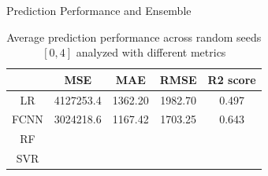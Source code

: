 \documentclass{beamer} %
\begin{document}
\begin{frame}{Prediction Performance and Ensemble}
  \begin{table}[ht!]
    \hspace{-0.9cm}
    \begin{tabular}{|c|c|c|c|c|}
        \hline
        & MSE & MAE & RMSE & R2 score\\
        \hline
        LR & 4127253.4 & 1362.20 & 1982.70 & 0.497 \\
        FCNN & 3024218.6 & 1167.42 & 1703.25 & 0.643 \\
        RF &  &  &  &  \\
        SVR &  &  &  &  \\
        \hline
    \end{tabular}
    \caption{Average prediction performance across random seeds $[0, 4]$ analyzed with different metrics}
    \label{tab:pred_perf}
\end{table}
\end{frame}
\end{document}

